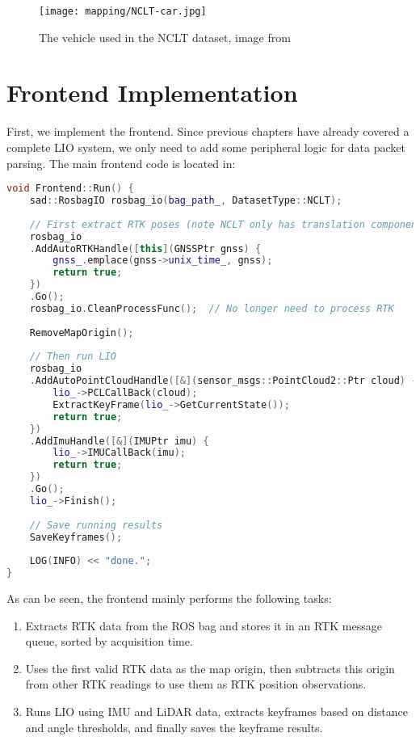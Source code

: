 \begin{figure}  
	\centering  
	\texttt{[image: mapping/NCLT-car.jpg]}  
	\caption{The vehicle used in the NCLT dataset, image from \cite{CarlevarisBianco2015}}  
	\label{fig:nclt-car}  
\end{figure}

\section{Frontend Implementation}
First, we implement the frontend. Since previous chapters have already covered a complete LIO system, we only need to add some peripheral logic for data packet parsing. The main frontend code is located in:

\begin{lstlisting}[language=c++,caption=src/ch9/frontend.cc]
void Frontend::Run() {
	sad::RosbagIO rosbag_io(bag_path_, DatasetType::NCLT);
	
	// First extract RTK poses (note NCLT only has translation components)
	rosbag_io
	.AddAutoRTKHandle([this](GNSSPtr gnss) {
		gnss_.emplace(gnss->unix_time_, gnss);
		return true;
	})
	.Go();
	rosbag_io.CleanProcessFunc();  // No longer need to process RTK
	
	RemoveMapOrigin();
	
	// Then run LIO
	rosbag_io
	.AddAutoPointCloudHandle([&](sensor_msgs::PointCloud2::Ptr cloud) -> bool {
		lio_->PCLCallBack(cloud);
		ExtractKeyFrame(lio_->GetCurrentState());
		return true;
	})
	.AddImuHandle([&](IMUPtr imu) {
		lio_->IMUCallBack(imu);
		return true;
	})
	.Go();
	lio_->Finish();
	
	// Save running results
	SaveKeyframes();
	
	LOG(INFO) << "done.";
}
\end{lstlisting}

As can be seen, the frontend mainly performs the following tasks:
\begin{enumerate}
	\item Extracts RTK data from the ROS bag and stores it in an RTK message queue, sorted by acquisition time.
	\item Uses the first valid RTK data as the map origin, then subtracts this origin from other RTK readings to use them as RTK position observations.
	\item Runs LIO using IMU and LiDAR data, extracts keyframes based on distance and angle thresholds, and finally saves the keyframe results.
\end{enumerate}

